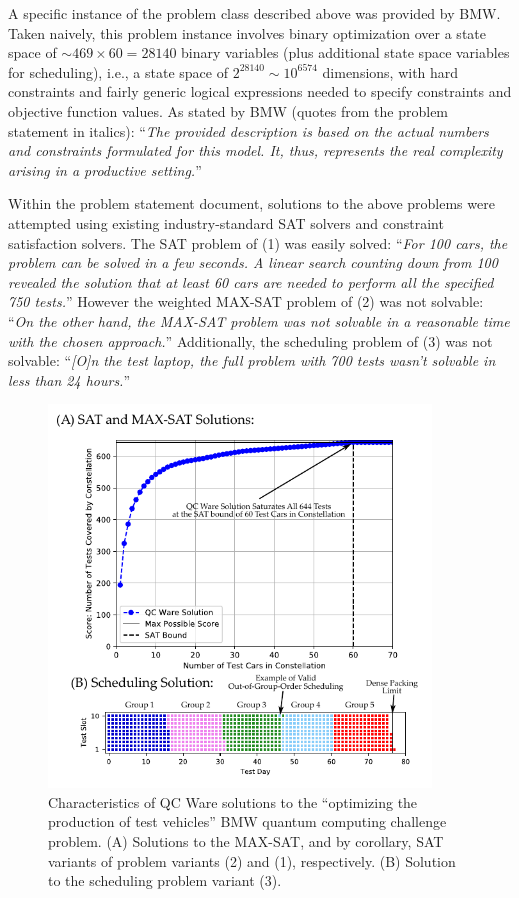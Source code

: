 \documentclass[aps,pra,twocolumn,superscriptaddress,groupedaddress]{revtex4}  %
\begin{document}
A specific instance of the problem class described above was provided by BMW.
Taken naively, this problem instance involves binary optimization over a state
space of $\sim 469\times60 = 28140$ binary variables (plus additional state
space variables for scheduling), i.e., a state space of $2^{28140} \sim
10^{6574}$ dimensions, with hard constraints and fairly generic logical
expressions needed to specify constraints and objective function values.  As
stated by BMW (quotes from the problem statement in italics): ``\textit{The
provided description is based on the actual numbers and constraints formulated
for this model. It, thus, represents the real complexity arising in a productive
setting.}''

Within the problem statement document, solutions to the above problems were
attempted using existing industry-standard SAT solvers and constraint
satisfaction solvers. The SAT problem of (1) was easily solved:
``\textit{For 100 cars, the problem can be solved in a few seconds. A linear search counting down
from 100 revealed the solution that at least 60 cars are needed to perform all the specified
750 tests.}''
However the weighted MAX-SAT problem of (2) was not solvable:
``\textit{On the other hand, the MAX-SAT problem was not solvable in a reasonable time with the
chosen approach.}''
Additionally, the scheduling problem of (3) was not solvable:
``\textit{[O]n the test laptop, the full problem with 700 tests wasn't solvable in less than 24
hours.}''

\begin{figure}[ht]
\begin{center}
\includegraphics[width=4in]{figures/phase1/solution.pdf}
\caption{Characteristics of QC Ware solutions to the ``optimizing the production
of test vehicles'' BMW quantum computing challenge problem. (A) Solutions
to the MAX-SAT, and by corollary, SAT variants of problem variants (2) and (1),
respectively. (B) Solution to the scheduling problem variant (3).}
\label{fig:solution}
\end{center}
\end{figure}
\end{document}
